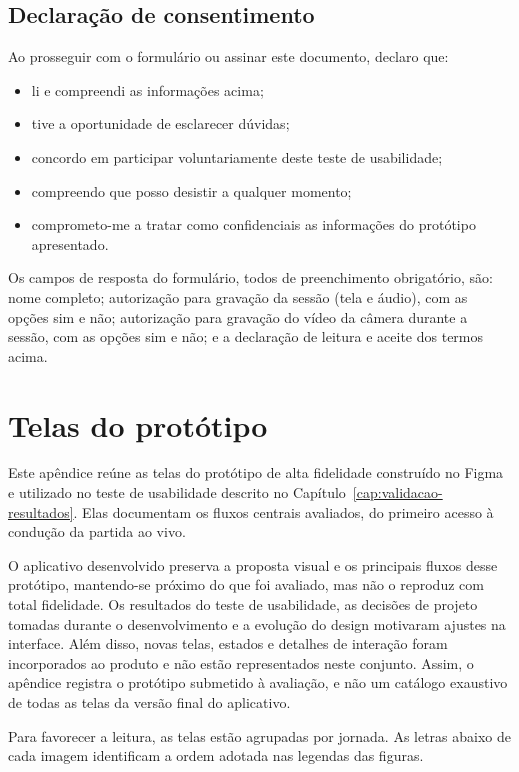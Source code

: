 \begin{apendicesenv}
    \section*{Declaração de consentimento}
        Ao prosseguir com o formulário ou assinar este documento, declaro que:

        \begin{itemize}
            \item li e compreendi as informações acima;
            \item tive a oportunidade de esclarecer dúvidas;
            \item concordo em participar voluntariamente deste teste de usabilidade;
            \item compreendo que posso desistir a qualquer momento;
            \item comprometo-me a tratar como confidenciais as informações do protótipo apresentado.
        \end{itemize}

        \noindent Os campos de resposta do formulário, todos de preenchimento obrigatório, são: nome completo; autorização para gravação da sessão (tela e áudio), com as opções sim e não; autorização para gravação do vídeo da câmera durante a sessão, com as opções sim e não; e a declaração de leitura e aceite dos termos acima.

\chapter{Telas do protótipo}
    \label{apendice:telas}
    Este apêndice reúne as telas do protótipo de alta fidelidade construído no Figma e utilizado no teste de usabilidade descrito no Capítulo~\ref{cap:validacao-resultados}. Elas documentam os fluxos centrais avaliados, do primeiro acesso à condução da partida ao vivo.

    O aplicativo desenvolvido preserva a proposta visual e os principais fluxos desse protótipo, mantendo-se próximo do que foi avaliado, mas não o reproduz com total fidelidade. Os resultados do teste de usabilidade, as decisões de projeto tomadas durante o desenvolvimento e a evolução do design motivaram ajustes na interface. Além disso, novas telas, estados e detalhes de interação foram incorporados ao produto e não estão representados neste conjunto. Assim, o apêndice registra o protótipo submetido à avaliação, e não um catálogo exaustivo de todas as telas da versão final do aplicativo.

    Para favorecer a leitura, as telas estão agrupadas por jornada. As letras abaixo de cada imagem identificam a ordem adotada nas legendas das figuras.


\end{apendicesenv}
